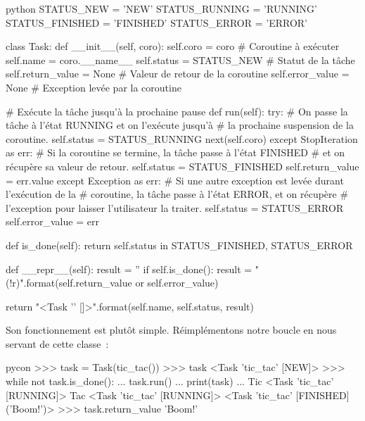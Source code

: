 \documentclass[small]{zmdocument}
\begin{document}
\begin{CodeBlock}{python}
STATUS_NEW = 'NEW'
STATUS_RUNNING = 'RUNNING'
STATUS_FINISHED = 'FINISHED'
STATUS_ERROR = 'ERROR'

class Task:
    def __init__(self, coro):
        self.coro = coro  # Coroutine à exécuter
        self.name = coro.__name__
        self.status = STATUS_NEW  # Statut de la tâche
        self.return_value = None  # Valeur de retour de la coroutine
        self.error_value = None  # Exception levée par la coroutine

    # Exécute la tâche jusqu'à la prochaine pause
    def run(self):
        try:
            # On passe la tâche à l'état RUNNING et on l'exécute jusqu'à
            # la prochaine suspension de la coroutine.
            self.status = STATUS_RUNNING
            next(self.coro)
        except StopIteration as err:
            # Si la coroutine se termine, la tâche passe à l'état FINISHED
            # et on récupère sa valeur de retour.
            self.status = STATUS_FINISHED
            self.return_value = err.value
        except Exception as err:
            # Si une autre exception est levée durant l'exécution de la
            # coroutine, la tâche passe à l'état ERROR, et on récupère
            # l'exception pour laisser l'utilisateur la traiter.
            self.status = STATUS_ERROR
            self.error_value = err

    def is_done(self):
        return self.status in {STATUS_FINISHED, STATUS_ERROR}

    def __repr__(self):
        result = ''
        if self.is_done():
            result = " ({!r})".format(self.return_value or self.error_value)

        return "<Task '{}' [{}]{}>".format(self.name, self.status, result)

\end{CodeBlock}



Son fonctionnement est plutôt simple. Réimplémentons notre boucle en nous
servant de cette classe :



\begin{CodeBlock}{pycon}
>>> task = Task(tic_tac())
>>> task
<Task 'tic_tac' [NEW]>
>>> while not task.is_done():
...     task.run()
...     print(task)
...
Tic
<Task 'tic_tac' [RUNNING]>
Tac
<Task 'tic_tac' [RUNNING]>
<Task 'tic_tac' [FINISHED] ('Boom!')>
>>> task.return_value
'Boom!'
\end{CodeBlock}
\end{document}

